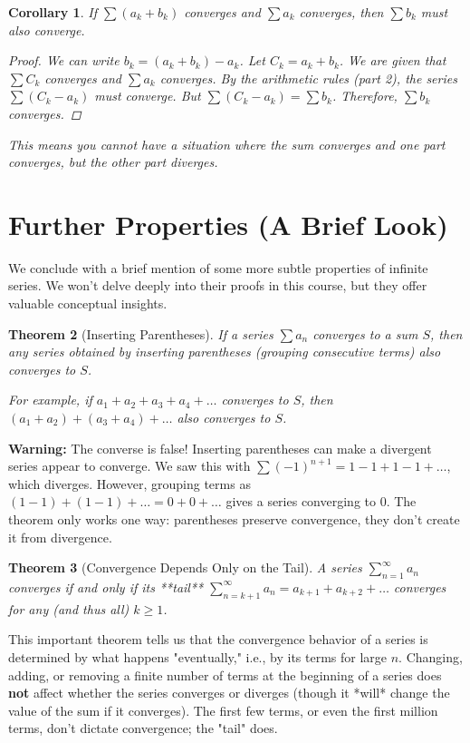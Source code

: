 \documentclass[11pt]{article}
\newtheorem{theorem}{Theorem}[section]
\newtheorem{corollary}[theorem]{Corollary}
\theoremstyle{definition}
\theoremstyle{remark}
\begin{document}
\begin{corollary}
If $\sum (a_k + b_k)$ converges and $\sum a_k$ converges, then $\sum b_k$ must also converge.
\begin{proof}
We can write $b_k = (a_k + b_k) - a_k$. Let $C_k = a_k + b_k$. We are given that $\sum C_k$ converges and $\sum a_k$ converges. By the arithmetic rules (part 2), the series $\sum (C_k - a_k)$ must converge. But $\sum (C_k - a_k) = \sum b_k$. Therefore, $\sum b_k$ converges.
\end{proof}
This means you cannot have a situation where the sum converges and one part converges, but the other part diverges.
\end{corollary}


\section{Further Properties (A Brief Look)}

We conclude with a brief mention of some more subtle properties of infinite series. We won't delve deeply into their proofs in this course, but they offer valuable conceptual insights.

\begin{theorem}[Inserting Parentheses]
If a series $\sum a_n$ converges to a sum $S$, then any series obtained by inserting parentheses (grouping consecutive terms) also converges to $S$.

For example, if $a_1+a_2+a_3+a_4+\dots$ converges to $S$, then $(a_1+a_2) + (a_3+a_4) + \dots$ also converges to $S$.
\end{theorem}

\textbf{Warning:} The converse is false! Inserting parentheses can make a divergent series appear to converge. We saw this with $\sum (-1)^{n+1} = 1-1+1-1+\dots$, which diverges. However, grouping terms as $(1-1) + (1-1) + \dots = 0+0+\dots$ gives a series converging to 0. The theorem only works one way: parentheses preserve convergence, they don't create it from divergence.

\begin{theorem}[Convergence Depends Only on the Tail]
A series $\sum_{n=1}^{\infty} a_n$ converges if and only if its **tail** $\sum_{n=k+1}^{\infty} a_n = a_{k+1} + a_{k+2} + \dots$ converges for any (and thus all) $k \ge 1$.
\end{theorem}

This important theorem tells us that the convergence behavior of a series is determined by what happens "eventually," i.e., by its terms for large $n$. Changing, adding, or removing a finite number of terms at the beginning of a series does \textbf{not} affect whether the series converges or diverges (though it *will* change the value of the sum if it converges). The first few terms, or even the first million terms, don't dictate convergence; the "tail" does.
\end{document}
